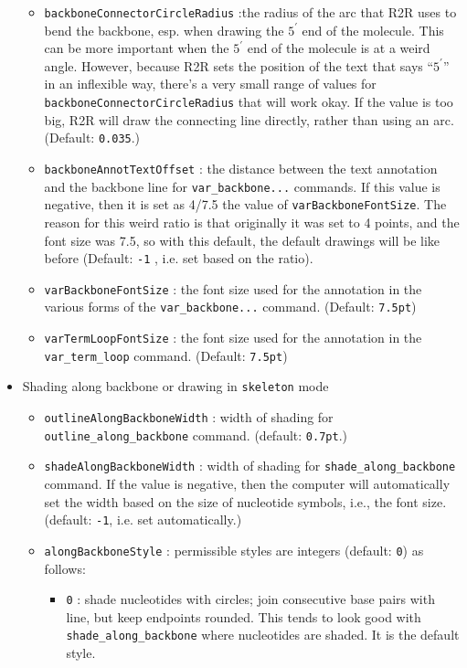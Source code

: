 \documentclass[letterpaper,12pt]{report}
\begin{document}
\begin{itemize}
\begin{itemize}
        \item {\tt backboneConnectorCircleRadius} :the radius of the arc that R2R uses to bend the backbone, esp. when drawing the $5^\prime$ end of the molecule.  This can be more important when the $5^\prime$ end of the molecule is at a weird angle.  However, because R2R sets the position of the text that says ``$5^\prime$'' in an inflexible way, there's a very small range of values for {\tt backboneConnectorCircleRadius} that will work okay.  If the value is too big, R2R will draw the connecting line directly, rather than using an arc.  (Default: {\tt 0.035}.)
        \item {\tt backboneAnnotTextOffset} : the distance between the text annotation and the backbone line for {\tt var\_backbone...} commands.  If this value is negative, then it is set as 4/7.5 the value of {\tt varBackboneFontSize}. The reason for this weird ratio is that originally it was set to 4 points, and the font size was 7.5, so with this default, the default drawings will be like before (Default: {\tt -1} , i.e. set based on the ratio).
      \item {\tt varBackboneFontSize} : the font size used for the annotation in the various forms of the {\tt var\_backbone...} command.  (Default: {\tt 7.5pt})
        \item {\tt varTermLoopFontSize} : the font size used for the annotation in the {\tt var\_term\_loop} command.  (Default: {\tt 7.5pt})
	\end{itemize}
\item Shading along backbone or drawing in {\tt skeleton} mode
	\begin{itemize}
	\item {\tt outlineAlongBackboneWidth} : width of shading for {\tt outline\_along\_backbone} command.  (default: {\tt 0.7pt}.)
	\item {\tt shadeAlongBackboneWidth} : width of shading for {\tt shade\_along\_backbone} command.  If the value is negative, then the computer will automatically set the width based on the size of nucleotide symbols, i.e., the font size.  (default: {\tt -1}, i.e. set automatically.)
	\item {\tt alongBackboneStyle} : permissible styles are integers (default: {\tt 0}) as follows:
		\begin{itemize}
		\item {\tt 0} : shade nucleotides with circles; join consecutive base pairs with line, but keep endpoints rounded.  This tends to look good with {\tt shade\_along\_backbone} where nucleotides are shaded.  It is the default style.

\end{itemize}
\end{itemize}
\end{itemize}
\end{document}
